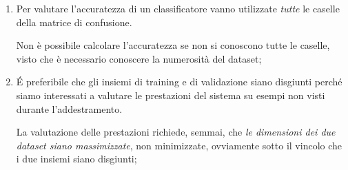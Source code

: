 \begin{enumerate}
	\item Per valutare l’accuratezza di un classificatore vanno utilizzate \emph{tutte} le caselle della matrice di confusione.

	Non è possibile calcolare l’accuratezza se non si conoscono tutte le caselle, visto che è necessario conoscere la numerosità del dataset;

	\item \'E preferibile che gli insiemi di training e di validazione siano disgiunti perché siamo interessati a valutare le prestazioni del sistema su esempi non visti durante l’addestramento.

	La valutazione delle prestazioni richiede, semmai, che \emph{le dimensioni dei due dataset siano massimizzate}, non minimizzate, ovviamente sotto il vincolo che i due insiemi siano disgiunti;
\end{enumerate}
